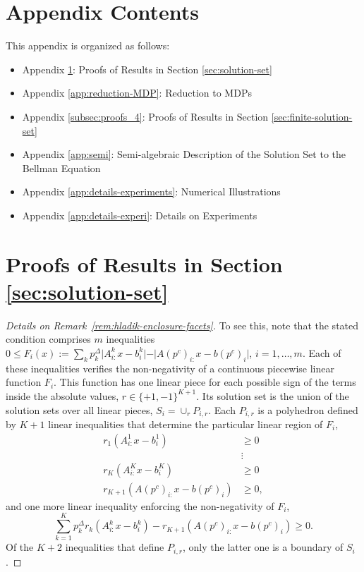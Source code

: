 \documentclass{article}
\theoremstyle{definition}
\theoremstyle{remark}
\begin{document}
\newpage

\appendix

\onecolumn 


\section*{Appendix Contents} 

This appendix is organized as follows: 
\begin{itemize}
    \item Appendix \ref{subsec:proofs_3}: Proofs of Results in Section \ref{sec:solution-set}
    
    \item Appendix \ref{app:reduction-MDP}: Reduction to MDPs 
    
    \item Appendix \ref{subsec:proofs_4}: Proofs of Results in Section \ref{sec:finite-solution-set}

    \item Appendix \ref{app:semi}: Semi-algebraic Description of the Solution Set to the Bellman Equation 

    \item Appendix \ref{app:details-experiments}: Numerical Illustrations

    \item Appendix \ref{app:details-experi}: Details on Experiments     
\end{itemize}

\newpage 
\section{Proofs of Results in Section \ref{sec:solution-set}}
\label{subsec:proofs_3}

\remhladikfacets* 

\begin{proof}[Details on Remark~\ref{rem:hladik-enclosure-facets}]
To see this, note that the stated condition comprises $m$ inequalities $0 \leq F_i(x) := \sum_k p_k^\Delta \vert A^k_{i:}x - b^k_i\vert  - \vert A(p^c)_{i:}x-b(p^c)_i\vert $, $i=1,\ldots, m$. 
%
Each of these inequalities verifies the non-negativity of a continuous piecewise linear function $F_i$. This function has one linear piece for each possible sign of the terms inside the absolute values, $r\in\{+1,-1\}^{K+1}$. 
%
Its solution set is the union of the solution sets over all linear pieces, $S_i = \cup_{r} P_{i,r}$. 
%
Each $P_{i,r}$ is a polyhedron defined by $K+1$ linear inequalities that determine the particular linear region of $F_i$, 
%
\begin{align*} 
    r_{1}(A^1_{i:} x-b^1_i)&\geq 0 \\
    &\vdots \\
    r_{K}(A^K_{i:} x-b^K_i)&\geq 0 \\
    r_{K+1}(A(p^c)_{i:} x -b(p^c)_i)&\geq 0, 
\end{align*} 
%
and one more linear inequality enforcing the non-negativity of $F_i$, 
%
$$
    \sum_{k=1}^Kp_k^\Delta r_k (A^k_{i:} x -b^k_i) - r_{K+1}(A(p^c)_{i:} x - b(p^c)_i) \geq 0 . 
$$
%
Of the $K+2$ inequalities that define $P_{i,r}$, only the latter one is a boundary of $S_i$. 
\end{proof} 
\end{document}
